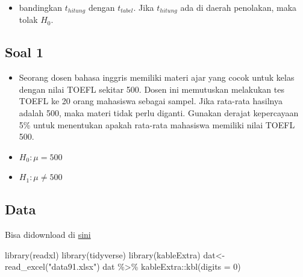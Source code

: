 \documentclass[
  letterpaper,
  DIV=11,
  numbers=noendperiod]{scrartcl}
\newenvironment{Shaded}{\begin{snugshade}}{\end{snugshade}}
\newcommand{\AttributeTok}[1]{\textcolor[rgb]{0.40,0.45,0.13}{#1}}
\newcommand{\DecValTok}[1]{\textcolor[rgb]{0.68,0.00,0.00}{#1}}
\newcommand{\FunctionTok}[1]{\textcolor[rgb]{0.28,0.35,0.67}{#1}}
\newcommand{\NormalTok}[1]{\textcolor[rgb]{0.00,0.23,0.31}{#1}}
\newcommand{\OtherTok}[1]{\textcolor[rgb]{0.00,0.23,0.31}{#1}}
\newcommand{\SpecialCharTok}[1]{\textcolor[rgb]{0.37,0.37,0.37}{#1}}
\newcommand{\StringTok}[1]{\textcolor[rgb]{0.13,0.47,0.30}{#1}}
\providecommand{\tightlist}{%
  \setlength{\itemsep}{0pt}\setlength{\parskip}{0pt}}\usepackage{longtable,booktabs,array}
\begin{document}
\begin{itemize}
\tightlist
\item
  bandingkan \(t_{hitung}\) dengan \(t_{tabel}\). Jika \(t_{hitung}\)
  ada di daerah penolakan, maka tolak \(H_0\).
\end{itemize}

\subsection{Soal 1}\label{soal-1}

\begin{itemize}
\item
  Seorang dosen bahasa inggris memiliki materi ajar yang cocok untuk
  kelas dengan nilai TOEFL sekitar 500. Dosen ini memutuskan melakukan
  tes TOEFL ke 20 orang mahasiswa sebagai sampel. Jika rata-rata
  hasilnya adalah 500, maka materi tidak perlu diganti. Gunakan derajat
  kepercayaan 5\% untuk menentukan apakah rata-rata mahasiswa memiliki
  nilai TOEFL 500.
\item
  \(H_0: \mu = 500\)
\item
  \(H_1: \mu \neq 500\)
\end{itemize}

\subsection{Data}\label{data}

Bisa didownload di
\href{https://docs.google.com/spreadsheets/d/1aE74llk9RkTuL2nLsp6WfvK0faz3DGKv/edit?usp=drive_link&ouid=117760147588370390523&rtpof=true&sd=true}{sini}

\begin{Shaded}
\begin{Highlighting}[]
\FunctionTok{library}\NormalTok{(readxl)}
\FunctionTok{library}\NormalTok{(tidyverse)}
\FunctionTok{library}\NormalTok{(kableExtra)}
\NormalTok{dat}\OtherTok{\textless{}{-}}\FunctionTok{read\_excel}\NormalTok{(}\StringTok{"data91.xlsx"}\NormalTok{)}
\NormalTok{dat }\SpecialCharTok{\%\textgreater{}\%}\NormalTok{ kableExtra}\SpecialCharTok{::}\FunctionTok{kbl}\NormalTok{(}\AttributeTok{digits =} \DecValTok{0}\NormalTok{)}
\end{Highlighting}
\end{Shaded}
\end{document}
